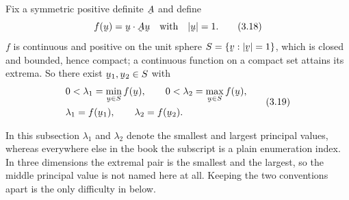 Fix a symmetric positive definite $\bA$ and define
\begin{equation}
   f(\bu)=\ip{\bu}{\bA\bu}\quad\text{with}\quad|\bu|=1 .
   \tag{3.18}\label{eq:3.18}
\end{equation}
$f$ is continuous and positive on the unit sphere
$S=\{\bv:|\bv|=1\}$, which is closed and bounded, hence compact; a
continuous function on a compact set attains its extrema. So there exist
$\bu_{1},\bu_{2}\in S$ with
\begin{equation}
\begin{aligned}
   &0<\lambda_{1}=\min_{\bu\in S}f(\bu),\qquad
    0<\lambda_{2}=\max_{\bu\in S}f(\bu),\\
   &\lambda_{1}=f(\bu_{1}),\qquad \lambda_{2}=f(\bu_{2}).
\end{aligned}
   \tag{3.19}\label{eq:3.19}
\end{equation}

\begin{remark}\label{rem:labelwarn}
In this subsection $\lambda_{1}$ and $\lambda_{2}$ denote the smallest and
largest principal values, whereas everywhere else in the book the subscript
is a plain enumeration index. In three dimensions the extremal pair is the
smallest and the largest, so the middle principal value is not named here
at all. Keeping the two conventions apart is the only difficulty in
 below.
\end{remark}

